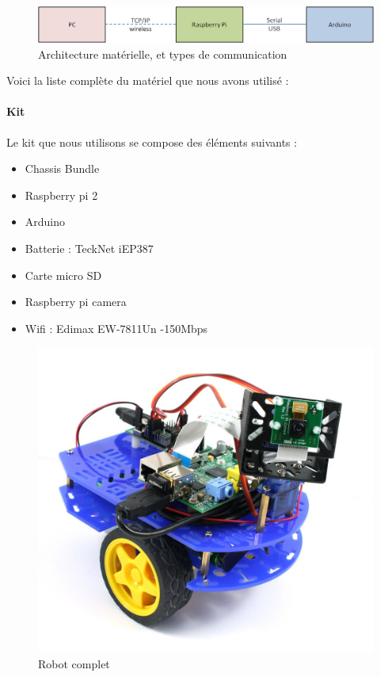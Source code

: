 \documentclass[12pt,a4paper]{report}
\begin{document}
\begin{figure}[hf!]
\center
\includegraphics[scale=0.8]{images/ArchitectureMaterielle.png}
\caption{Architecture matérielle, et types de communication}
\end{figure}

Voici la liste complète du matériel que nous avons utilisé :

\paragraph{Kit} Le kit que nous utilisons se compose des éléments suivants :

\begin{itemize}
\item Chassis Bundle
\item Raspberry pi 2
\item Arduino
\item Batterie : TeckNet iEP387
\item Carte micro SD
\item Raspberry pi camera
\item Wifi : Edimax EW-7811Un -150Mbps
\end{itemize}

\begin{figure}[hf!]
\center
\includegraphics[scale=0.2]{images/kit.jpg}
\caption{Robot complet}
\end{figure}
\end{document}
